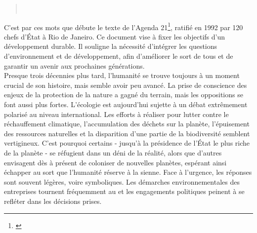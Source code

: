 

\begin{quotation}
\Large
\centering
    \\
\end{quotation}

C'est par ces mots que débute le texte de l'Agenda 21\footnote{\textcite{united_nations_conference_on_environment_and_development1992agenda}}, ratifié en 1992 par 120 chefs d'État à Rio de Janeiro. Ce document vise à fixer les objectifs d'un développement durable. Il souligne la nécessité d'intégrer les questions d'environnement et de développement, afin d'améliorer le sort de tous et de garantir un avenir aux prochaines générations. \\

Presque trois décennies plus tard, l'humanité se trouve toujours à un moment crucial de son histoire, mais semble avoir peu avancé. La prise de conscience des enjeux de la protection de la nature a gagné du terrain, mais les oppositions se font aussi plus fortes. L'écologie est aujourd'hui sujette à un débat extrêmement polarisé au niveau international. Les efforts à réaliser pour lutter contre le réchauffement climatique, l'accumulation des déchets sur la planète, l'épuisement des ressources naturelles et la disparition d'une partie de la biodiversité semblent vertigineux. C'est pourquoi certains - jusqu'à la présidence de l'État le plus riche de la planète - se réfugient dans un déni de la réalité, alors que d'autres envisagent dès à présent de coloniser de nouvelles planètes, espérant ainsi échapper au sort que l'humanité réserve à la sienne. Face à l'urgence, les réponses sont souvent légères, voire symboliques. Les démarches environnementales des entreprises tournent fréquemment au  et les engagements politiques peinent à se refléter dans les décisions prises. \\

